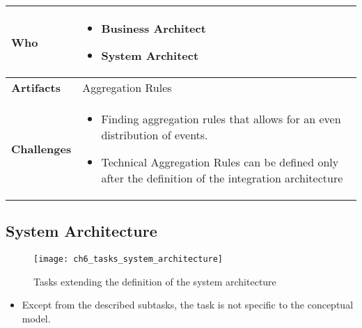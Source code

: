 \begin{tabularx}{\textwidth}{@{} l X @{}}
	\midrule
	\bfseries Who & 
	\begin{itemize}
		\item Business Architect
		\item System Architect
	\end{itemize}
	\\
	\midrule
	\bfseries Artifacts & Aggregation Rules\\
	\midrule
	\bfseries Challenges & 
	\begin{itemize}
		\item Finding aggregation rules that allows for an even distribution of events.
		\item Technical Aggregation Rules can be defined only after the definition of the integration architecture
	\end{itemize}\\
	\bottomrule 
\end{tabularx}

\subsection{System Architecture }

\begin{figure}[htpb] \centering 
	\texttt{[image: ch6\_tasks\_system\_architecture]} 
	\caption{Tasks extending the definition of the system architecture} 
	\label{fig:ch6_tasks_system_architecture} 
\end{figure}

\begin{itemize}
	\item Except from the described subtasks, the task is not specific to the conceptual model.
\end{itemize}

